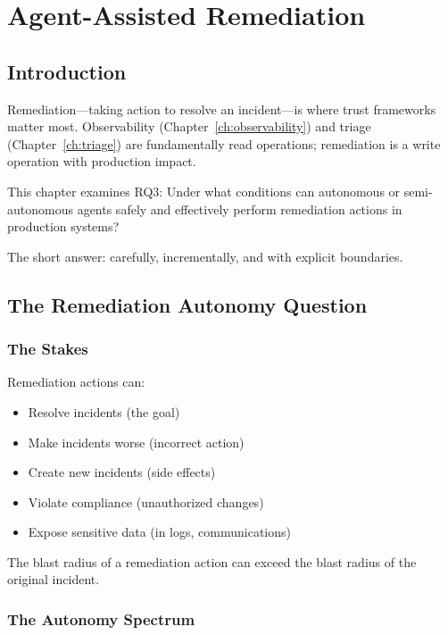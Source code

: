 \chapter{Agent-Assisted Remediation}
\label{ch:remediation}


\section{Introduction}
\label{sec:remediation-intro}

Remediation---taking action to resolve an incident---is where trust frameworks matter most. Observability (Chapter~\ref{ch:observability}) and triage (Chapter~\ref{ch:triage}) are fundamentally read operations; remediation is a write operation with production impact.

This chapter examines RQ3: Under what conditions can autonomous or semi-autonomous agents safely and effectively perform remediation actions in production systems?

The short answer: carefully, incrementally, and with explicit boundaries.

\section{The Remediation Autonomy Question}
\label{sec:remediation-autonomy}

\subsection{The Stakes}
\label{subsec:remediation-stakes}

Remediation actions can:
\begin{itemize}
    \item Resolve incidents (the goal)
    \item Make incidents worse (incorrect action)
    \item Create new incidents (side effects)
    \item Violate compliance (unauthorized changes)
    \item Expose sensitive data (in logs, communications)
\end{itemize}

The blast radius of a remediation action can exceed the blast radius of the original incident.

\subsection{The Autonomy Spectrum}
\label{subsec:autonomy-spectrum}


